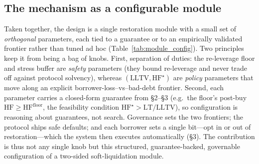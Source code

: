 \documentclass[12pt]{article}
\begin{document}
\subsection{The mechanism as a configurable module}
\label{sec:module}
Taken together, the design is a single restoration module with a small set of \emph{orthogonal} parameters, each tied to a guarantee or to an empirically validated frontier rather than tuned ad hoc (Table~\ref{tab:module_config}). Two principles keep it from being a bag of knobs. First, separation of duties: the re-leverage floor and stress buffer are \emph{safety} parameters (they bound re-leverage and never trade off against protocol solvency), whereas $(\mathrm{LLTV},\mathrm{HF}^{\star})$ are \emph{policy} parameters that move along an explicit borrower-loss--vs--bad-debt frontier. Second, each parameter carries a closed-form guarantee from \S2--\S3 (e.g.\ the floor's post-buy $\mathrm{HF}\ge\mathrm{HF}^{\text{floor}}$, the feasibility condition $\mathrm{HF}^{\star}>\mathrm{LT}/\mathrm{LLTV}$), so configuration is reasoning about guarantees, not search. Governance sets the two frontiers; the protocol ships safe defaults; and each borrower sets a single bit---opt in or out of restoration---which the system then executes automatically (\S3). The contribution is thus not any single knob but this structured, guarantee-backed, governable configuration of a two-sided soft-liquidation module.

\begin{table}[h!]
\centering
\caption{The restoration module as a small set of guarantee-backed parameters. Safety parameters never trade against protocol solvency; policy parameters move along an explicit frontier. Defaults are the swept/OOS-validated values.}
\label{tab:module_config}
\end{table}
\end{document}
